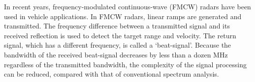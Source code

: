 In recent years, frequency-modulated continuous-wave (FMCW) radars have been used in vehicle applications. In FMCW radars, linear ramps are generated and transmitted. The frequency difference between a transmitted signal and its received reflection is used to detect the target range and velocity. The return signal, which has a different frequency, is called a ‘beat-signal’. Because the bandwidth of the received beat-signal decreases by less than a dozen MHz regardless of the transmitted bandwidth, the complexity of the signal processing can be reduced, compared with that of conventional spectrum analysis.